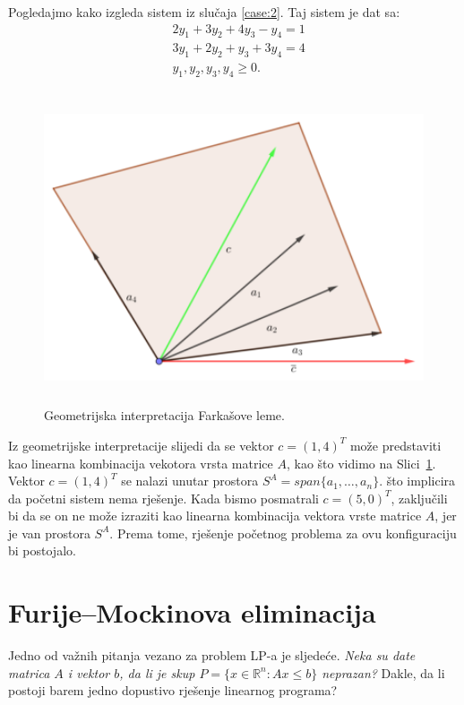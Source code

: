 \documentclass[a4paper, utf8, 11pt, colorlinks]{book}
\theoremstyle{definition}
\begin{document}
Pogledajmo kako izgleda sistem iz slučaja \ref{case:2}. Taj sistem je dat sa:
\begin{align*}
	&2 y_1 + 3 y_2 + 4 y_3 - y_4 = 1\\
	&3y_1 + 2 y_2 + y_3 + 3 y_4 = 4 \\
	& y_1, y_2, y_3, y_4 \geq 0. 
\end{align*}
\begin{figure}[!ht]
	\centering
	\includegraphics[width=350pt, height=260pt]{farkas-geometry.eps}
	\vspace{-1cm}
	\caption{Geometrijska interpretacija Farkašove leme.}
	\label{fig:farkas-slika}
\end{figure}
Iz geometrijske interpretacije slijedi da se vektor $c =(1,4)^T$ može predstaviti kao linearna kombinacija vekotora vrsta matrice $A$, kao što vidimo na Slici~\ref{fig:farkas-slika}. Vektor $c =(1,4)^T$ se nalazi unutar prostora $S^A = span\{a_1, \ldots, a_n \}$. što implicira da početni sistem nema rješenje. 
Kada bismo posmatrali $c=(5,0)^T$, zaključili bi da se on ne može izraziti kao linearna kombinacija vektora vrste matrice $A$, jer je van prostora  $S^A $. Prema tome, rješenje početnog problema za ovu konfiguraciju bi postojalo.  

\section{Furije–Mockinova eliminacija}
Jedno od važnih pitanja vezano za problem  LP-a je sljedeće. 
\emph{Neka su date matrica $A$ i vektor $b$, da li je skup $P = \{x \in \mathbb{R}^n \colon A x \leq b\}$ neprazan?} Dakle, da li postoji barem jedno dopustivo rješenje linearnog programa? 
\end{document}
